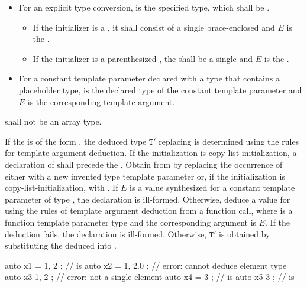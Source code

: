 \begin{itemize}
\begin{itemize}
a single 
and $E$ is the .
\end{itemize}
\item
For an explicit type conversion,
 is the specified type, which shall be .
\begin{itemize}
\item
If the initializer is a ,
it shall consist of a single brace-enclosed 
and $E$ is the .
\item
If the initializer is a parenthesized ,
the  shall be
a single 
and $E$ is the .
\end{itemize}
\item
For a constant template parameter declared with a type
that contains a placeholder type,
 is the declared type of the constant template parameter
and $E$ is the corresponding template argument.
\end{itemize}

 shall not be an array type.

\pnum
If the  is of the form
 ,
the deduced type
$\mathtt{T}'$ replacing 
is determined using the rules for template argument deduction.
If the initialization is copy-list-initialization,
a declaration of 
shall precede
the .
Obtain  from
 by replacing the occurrence of
  either with
a new invented type template parameter  or,
if the initialization is copy-list-initialization, with
.
If $E$ is a value synthesized for a constant template parameter
of type ,
the declaration is ill-formed.
Otherwise, deduce a value for  using the rules
of template argument deduction from a function call,
where  is a
function template parameter type and
the corresponding argument is $E$.
If the deduction fails, the declaration is ill-formed.
Otherwise, $\mathtt{T}'$ is obtained by
substituting the deduced  into .
\begin{example}
\begin{codeblock}
auto x1 = { 1, 2 };             //  is 
auto x2 = { 1, 2.0 };           // error: cannot deduce element type
auto x3{ 1, 2 };                // error: not a single element
auto x4 = { 3 };                //  is 
auto x5{ 3 };                   //  is 
\end{codeblock}
\end{example}

